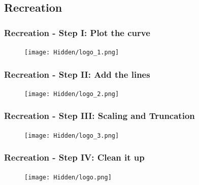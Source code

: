 \documentclass{beamer}
\theoremstyle{remark}
\numberwithin{equation}{section}
\begin{document}
\subsection{Recreation}
\begin{frame}[fragile]
    \frametitle{Recreation - Step I: Plot the curve}

    \begin{figure}[H]
		\centering
		\texttt{[image: Hidden/logo\_1.png]}
	\end{figure}

\end{frame}

\begin{frame}[fragile]
    \frametitle{Recreation - Step II: Add the lines}

    \begin{figure}[H]
		\centering
		\texttt{[image: Hidden/logo\_2.png]}
	\end{figure}

\end{frame}

\begin{frame}[fragile]
    \frametitle{Recreation - Step III: Scaling and Truncation}

    \begin{figure}[H]
		\centering
		\texttt{[image: Hidden/logo\_3.png]}
	\end{figure}

\end{frame}

\begin{frame}[fragile]
    \frametitle{Recreation - Step IV: Clean it up}

    \begin{figure}[H]
		\centering
		\texttt{[image: Hidden/logo.png]}
	\end{figure}

\end{frame}
\end{document}
